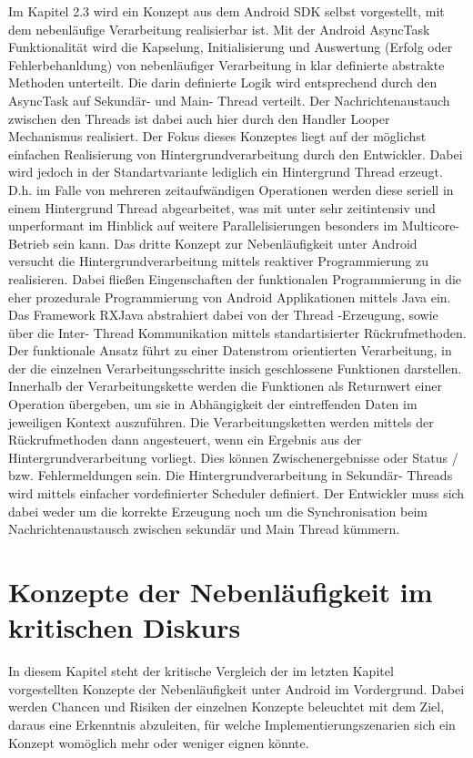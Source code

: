 \documentclass[12pt,oneside,a4paper,bibtotoc,liststotoc]{scrreprt}
\begin{document}
Im Kapitel 2.3 wird ein Konzept aus dem Android SDK selbst vorgestellt, mit dem nebenläufige Verarbeitung realisierbar ist. Mit der Android AsyncTask Funktionalität wird die Kapselung, Initialisierung und Auswertung (Erfolg oder Fehlerbehanldung) von nebenläufiger Verarbeitung in klar definierte abstrakte Methoden unterteilt. Die darin definierte Logik wird entsprechend durch den AsyncTask auf Sekundär- und Main- Thread verteilt. Der Nachrichtenaustauch zwischen den Threads ist dabei auch hier durch den Handler Looper Mechanismus realisiert. Der Fokus dieses Konzeptes liegt auf der möglichst einfachen Realisierung von Hintergrundverarbeitung durch den Entwickler. Dabei wird jedoch in der Standartvariante lediglich ein Hintergrund Thread erzeugt. D.h. im Falle von mehreren zeitaufwändigen Operationen werden diese seriell in einem Hintergrund Thread abgearbeitet, was mit unter sehr zeitintensiv und unperformant im Hinblick auf weitere Parallelisierungen besonders im Multicore-Betrieb sein kann. \newline
Das dritte Konzept zur Nebenläufigkeit unter Android versucht die Hintergrundverarbeitung mittels reaktiver Programmierung zu realisieren. Dabei fließen Eingenschaften der funktionalen Programmierung in die eher prozedurale Programmierung von Android Applikationen mittels Java ein. Das Framework RXJava abstrahiert dabei von der Thread -Erzeugung, sowie über die Inter- Thread Kommunikation mittels standartisierter Rückrufmethoden. Der funktionale Ansatz führt zu einer Datenstrom orientierten Verarbeitung, in der die einzelnen Verarbeitungsschritte insich geschlossene Funktionen darstellen. Innerhalb der Verarbeitungskette werden die Funktionen als Returnwert einer Operation übergeben, um sie in Abhängigkeit der eintreffenden Daten im jeweiligen Kontext auszuführen.  Die Verarbeitungsketten werden mittels der Rückrufmethoden dann angesteuert, wenn ein Ergebnis aus der Hintergrundverarbeitung vorliegt. Dies können Zwischenergebnisse oder Status / bzw. Fehlermeldungen sein.
Die Hintergrundverarbeitung in Sekundär- Threads wird mittels einfacher vordefinierter Scheduler definiert. Der Entwickler muss sich dabei weder um die korrekte Erzeugung noch um die Synchronisation beim Nachrichtenaustausch zwischen sekundär und Main Thread kümmern. \newline

\chapter{Konzepte der Nebenläufigkeit im kritischen Diskurs}
In diesem Kapitel steht der kritische Vergleich der im letzten Kapitel vorgestellten Konzepte der Nebenläufigkeit unter Android im Vordergrund. Dabei werden Chancen und Risiken der einzelnen Konzepte beleuchtet mit dem Ziel, daraus eine Erkenntnis abzuleiten, für welche Implementierungszenarien sich ein Konzept womöglich mehr oder weniger eignen könnte.
\end{document}
